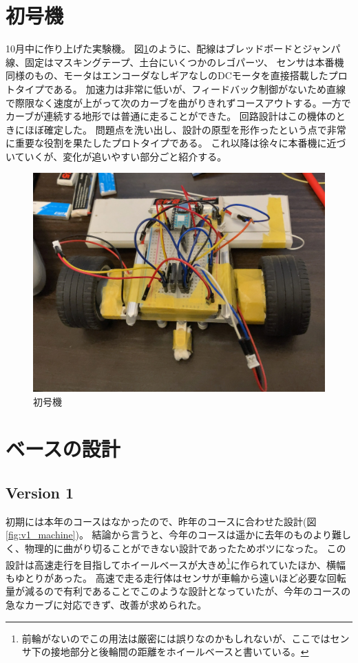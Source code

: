 \documentclass{ltjsreport}
\begin{document}
\section{初号機}
10月中に作り上げた実験機。
図\ref{fig:b_machine}のように、配線はブレッドボードとジャンパ線、固定はマスキングテープ、土台にいくつかのレゴパーツ、
センサは本番機同様のもの、モータはエンコーダなしギアなしのDCモータを直接搭載したプロトタイプである。
加速力は非常に低いが、フィードバック制御がないため直線で際限なく速度が上がって次のカーブを曲がりきれずコースアウトする。一方でカーブが連続する地形では普通に走ることができた。
回路設計はこの機体のときにほぼ確定した。
問題点を洗い出し、設計の原型を形作ったという点で非常に重要な役割を果たしたプロトタイプである。
これ以降は徐々に本番機に近づいていくが、変化が追いやすい部分ごと紹介する。
\begin{figure}[bth]
  \centering
  \includegraphics[keepaspectratio, scale=0.2]
       {img/beginning_machine.jpg}
  \caption{初号機}
  \label{fig:b_machine}
 \end{figure}

\section{ベースの設計}
\subsection{Version 1}
初期には本年のコースはなかったので、昨年のコースに合わせた設計(図\ref{fig:v1_machine})。
結論から言うと、今年のコースは遥かに去年のものより難しく、物理的に曲がり切ることができない設計であったためボツになった。
この設計は高速走行を目指してホイールベースが大きめ\footnote{前輪がないのでこの用法は厳密には誤りなのかもしれないが、ここではセンサ下の接地部分と後輪間の距離をホイールベースと書いている。}に作られていたほか、横幅もゆとりがあった。
高速で走る走行体はセンサが車輪から遠いほど必要な回転量が減るので有利であることでこのような設計となっていたが、今年のコースの急なカーブに対応できず、改善が求められた。
\end{document}
